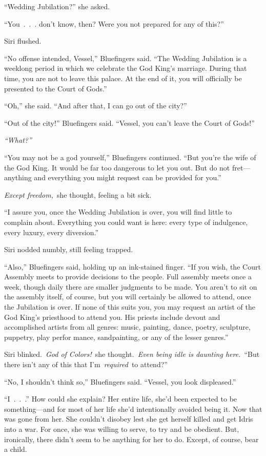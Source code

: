 “Wedding Jubilation?” she asked.

“You~.~.~. don’t know, then? Were you not prepared for any of this?”

Siri flushed.

“No offense intended, Vessel,” Bluefingers said. “The Wedding Jubilation is a weeklong period in which we celebrate the God King’s marriage. During that time, you are not to leave this palace. At the end of it, you will officially be presented to the Court of Gods.”

“Oh,” she said. “And after that, I can go out of the city?”

“Out of the city!” Bluefingers said. “Vessel, you can’t leave the Court of Gods!”

\textit{“What?”}

“You may not be a god yourself,” Bluefingers continued. “But you’re the wife of the God King. It would be far too dangerous to let you out. But do not fret—anything and everything you might request can be provided for you.”

\textit{Except freedom,}~she thought, feeling a bit sick.

“I assure you, once the Wedding Jubilation is over, you will find little to complain about. Everything you could want is here: every type of indulgence, every luxury, every diversion.”

Siri nodded numbly, still feeling trapped.

“Also,” Bluefingers said, holding up an ink-stained finger. “If you wish, the Court Assembly meets to provide decisions to the people. Full assembly meets once a week, though daily there are smaller judgments to be made. You aren’t to sit on the assembly itself, of course, but you will certainly be allowed to attend, once the Jubilation is over. If none of this suits you, you may request an artist of the God King’s priesthood to attend you. His priests include devout and accomplished artists from all genres: music, painting, dance, poetry, sculpture, puppetry, play perfor mance, sandpainting, or any of the lesser genres.”

Siri blinked.~\textit{God of Colors!}~she thought.~\textit{Even being idle is daunting here.}~“But there isn’t any of this that I’m~\textit{required}~to attend?”

“No, I shouldn’t think so,” Bluefingers said. “Vessel, you look displeased.”

“I~.~.~.” How could she explain? Her entire life, she’d been expected to be something—and for most of her life she’d intentionally avoided being it. Now that was gone from her. She couldn’t disobey lest she get herself killed and get Idris into a war. For once, she was willing to serve, to try and be obedient. But, ironically, there didn’t seem to be anything for her to do. Except, of course, bear a child.

